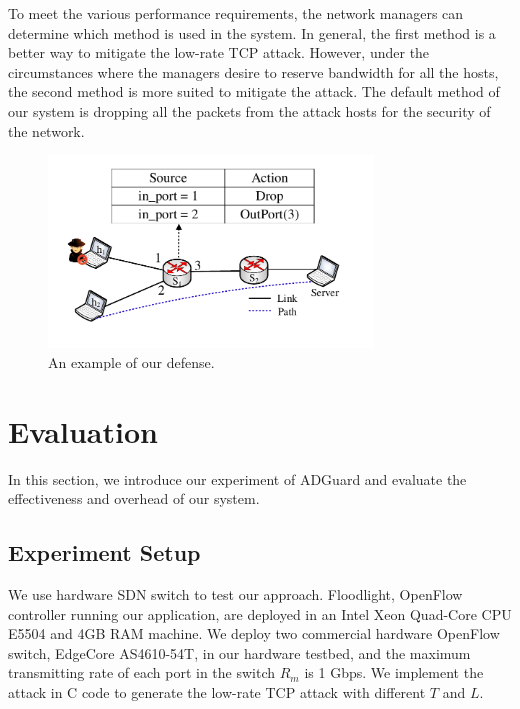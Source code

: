 \documentclass[conference]{IEEEtran}
\newcommand{\TheName}{ADGuard}
\begin{document}
To meet the various performance requirements, the network managers can determine which method is used in the system. In general, the first method is a better way to mitigate the low-rate TCP attack. However, under the circumstances where the managers desire to reserve bandwidth for all the hosts, the second method is more suited to mitigate the attack. The default method of our system is dropping all the packets from the attack hosts for the security of the network. 



\begin{figure}
\vspace{-0.2in}
\centering
\includegraphics[width=3.4in]{Design/defense.pdf}
\vspace{-0.1in}
\caption{\small{An example of our defense.}}
\label{fig:mitigate}
\vspace{-0.2in}
\end{figure}



\section{Evaluation}

In this section, we introduce our experiment of \TheName{} and evaluate the effectiveness and overhead of our system. 

\subsection{Experiment Setup}
We use hardware SDN switch to test our approach. Floodlight, OpenFlow controller running our application, are deployed in an Intel Xeon Quad-Core CPU E5504 and 4GB RAM machine. We deploy two commercial hardware OpenFlow switch, EdgeCore AS4610-54T, in our hardware testbed, and the maximum transmitting rate of each port in the switch $R_m$ is 1 Gbps. We implement the attack in C code to generate the low-rate TCP attack with different $T$ and $L$. 
\end{document}
